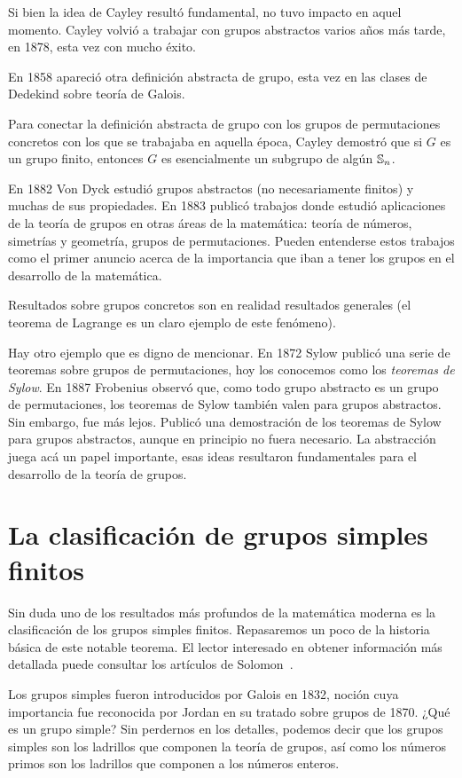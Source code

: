 Si bien la idea de Cayley 
resultó fundamental, no tuvo impacto en aquel momento. Cayley volvió a trabajar
con grupos abstractos varios años más tarde, en 1878, esta vez con mucho éxito. 

En 1858 apareció otra definición abstracta de grupo, esta vez 
en las clases de Dedekind sobre teoría de Galois. 

Para conectar
la definición abstracta de grupo con los 
grupos de permutaciones concretos con los que 
se trabajaba en aquella época, 
Cayley demostró que si $G$ es un grupo finito, entonces
$G$ es esencialmente un subgrupo de algún $\mathbb{S}_n$. 

En 1882 Von Dyck estudió grupos abstractos (no necesariamente finitos) y muchas de sus propiedades. En 1883 publicó trabajos donde estudió aplicaciones de la teoría de
grupos en otras áreas de la matemática: teoría de números, simetrías y geometría, grupos de permutaciones. Pueden entenderse estos trabajos como el primer anuncio
acerca de la importancia que iban a tener los grupos en el desarrollo de la matemática.  

Resultados sobre grupos concretos son en realidad resultados generales (el teorema de Lagrange es un claro ejemplo de este fenómeno). 

Hay otro ejemplo que es digno de mencionar. En 1872 Sylow
publicó una serie de teoremas sobre grupos de permutaciones, hoy los conocemos como
los \emph{teoremas de Sylow}. En 1887 Frobenius observó que, como todo grupo abstracto es un grupo de permutaciones, los teoremas de Sylow también valen para grupos abstractos. Sin embargo, fue más lejos. Publicó una demostración de los teoremas de Sylow para grupos abstractos, aunque en principio no fuera necesario. La abstracción juega acá un papel importante, esas ideas resultaron fundamentales 
para el desarrollo de la teoría de grupos. 

\section*{La clasificación de grupos simples finitos}

Sin duda uno de los resultados más profundos de la matemática moderna es la
clasificación de los grupos simples finitos. Repasaremos un poco de la historia
básica de este notable teorema. El lector interesado en obtener información más
detallada puede consultar los artículos de Solomon~\cite{MR1824893,MR3854074}. 

Los grupos simples fueron introducidos por Galois en 1832, noción cuya
importancia fue reconocida por Jordan en su tratado sobre grupos de 1870. 
¿Qué es un grupo
simple? Sin perdernos en los detalles, podemos decir que los grupos
simples son los ladrillos que componen la teoría de grupos, así como 
los números primos son los ladrillos que componen a los números enteros. 

